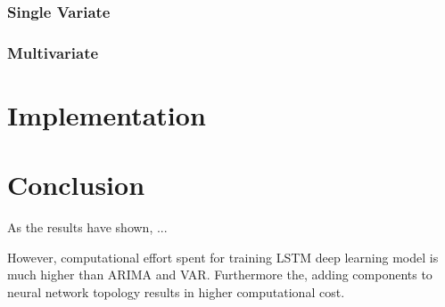 \documentclass[11pt]{article}
\begin{document}
\subsubsection{Single Variate}

\subsubsection{Multivariate}

\section{Implementation}

\section{Conclusion}
As the results have shown, ...

However, computational effort spent for training LSTM deep learning model is
much higher than ARIMA and VAR. Furthermore the, adding components to neural network
topology results in higher computational cost. 

\pagebreak


\end{document}
